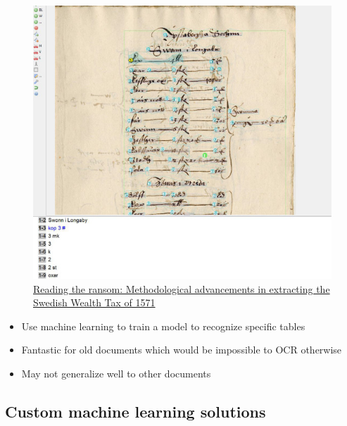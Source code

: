 \documentclass[
  letterpaper,
  DIV=11,
  numbers=noendperiod]{scrartcl}
\providecommand{\tightlist}{%
  \setlength{\itemsep}{0pt}\setlength{\parskip}{0pt}}\usepackage{longtable,booktabs,array}
\begin{document}
\begin{figure}

{\centering \includegraphics{assets/reading_ransom.jpg}

}

\caption{\href{}{Reading the ransom: Methodological advancements in
extracting the Swedish Wealth Tax of 1571}}

\end{figure}

\begin{itemize}
\tightlist
\item
  Use machine learning to train a model to recognize specific tables
\item
  Fantastic for old documents which would be impossible to OCR otherwise
\item
  May not generalize well to other documents
\end{itemize}

\hypertarget{custom-machine-learning-solutions-1}{%
\subsection{Custom machine learning
solutions}\label{custom-machine-learning-solutions-1}}
\end{document}
